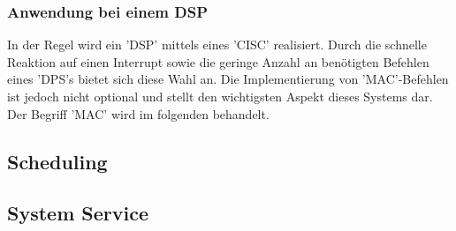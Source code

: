 \subsubsection{Anwendung bei einem DSP}
In der Regel wird ein 'DSP' mittels eines 'CISC' realisiert. Durch die schnelle Reaktion auf einen Interrupt sowie die geringe Anzahl an benötigten Befehlen eines 'DPS's bietet sich diese Wahl an. Die Implementierung von 'MAC'-Befehlen ist jedoch nicht optional und stellt den wichtigsten Aspekt dieses Systems dar. Der Begriff 'MAC' wird im folgenden behandelt.
\subsection{Scheduling}\label{2.6}
\subsection{System Service}\label{2.7}
